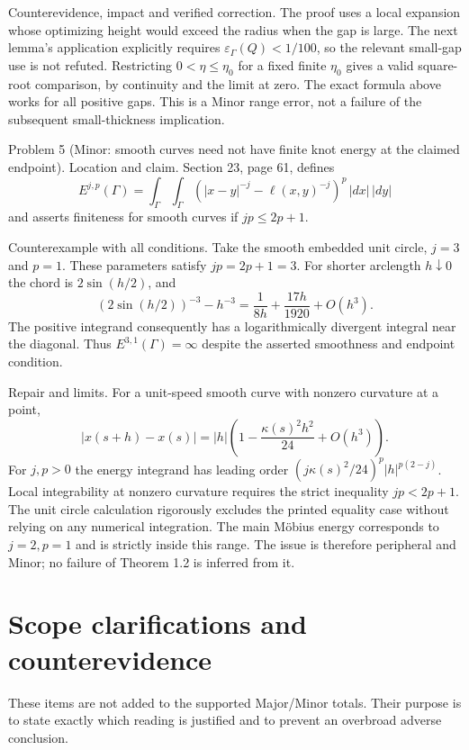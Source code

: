 \documentclass[10pt]{article}
\begin{document}
Counterevidence, impact and verified correction. The proof uses a local expansion whose optimizing height would exceed the radius when the gap is large. The next lemma’s application explicitly requires \(\varepsilon_\Gamma(Q)<1/100\), so the relevant small-gap use is not refuted. Restricting \(0<\eta\leq\eta_0\) for a fixed finite \(\eta_0\) gives a valid square-root comparison, by continuity and the limit at zero. The exact formula above works for all positive gaps. This is a Minor range error, not a failure of the subsequent small-thickness implication.\par
Problem 5 (Minor: smooth curves need not have finite knot energy at the claimed endpoint).  Location and claim. Section 23, page 61, defines \[E^{j,p}(\Gamma)
 =\int_\Gamma\!\int_\Gamma
   \left(|x-y|^{-j}-\ell(x,y)^{-j}\right)^p\,|dx|\,|dy|\] and asserts finiteness for smooth curves if \(jp\leq2p+1\).\par
Counterexample with all conditions. Take the smooth embedded unit circle, \(j=3\) and \(p=1\). These parameters satisfy \(jp=2p+1=3\). For shorter arclength \(h\downarrow0\) the chord is \(2\sin(h/2)\), and \[(2\sin(h/2))^{-3}-h^{-3}
 =\frac1{8h}+\frac{17h}{1920}+O(h^3).\] The positive integrand consequently has a logarithmically divergent integral near the diagonal. Thus \(E^{3,1}(\Gamma)=\infty\) despite the asserted smoothness and endpoint condition.\par
Repair and limits. For a unit-speed smooth curve with nonzero curvature at a point, \[|x(s+h)-x(s)|=|h|\left(1-\frac{\kappa(s)^2h^2}{24}+O(h^3)\right).\] For \(j,p>0\) the energy integrand has leading order \((j\kappa(s)^2/24)^p|h|^{p(2-j)}\). Local integrability at nonzero curvature requires the strict inequality \(jp<2p+1\). The unit circle calculation rigorously excludes the printed equality case without relying on any numerical integration. The main Möbius energy corresponds to \(j=2,p=1\) and is strictly inside this range. The issue is therefore peripheral and Minor; no failure of Theorem 1.2 is inferred from it.\par
\section*{Scope clarifications and counterevidence}
These items are not added to the supported Major/Minor totals. Their purpose is to state exactly which reading is justified and to prevent an overbroad adverse conclusion.\par
\end{document}
